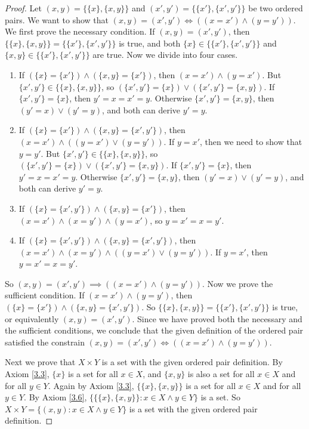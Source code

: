\begin{proof}
Let \((x, y) = \{\{x\}, \{x, y\}\}\) and \((x', y') = \{\{x'\}, \{x', y'\}\}\) be two ordered pairs.
We want to show that \((x, y) = (x', y') \iff ((x = x') \land (y = y'))\).
We first prove the necessary condition.
If \((x, y) = (x', y')\), then \(\{\{x\}, \{x, y\}\} = \{\{x'\}, \{x', y'\}\}\) is true, and both \(\{x\} \in \{\{x'\}, \{x', y'\}\}\) and \(\{x, y\} \in \{\{x'\}, \{x', y'\}\}\) are true.
Now we divide into four cases.
    \begin{enumerate}
        \item If \((\{x\} = \{x'\}) \land (\{x, y\} = \{x'\})\), then \((x = x') \land (y = x')\).
        But \(\{x', y'\} \in \{\{x\}, \{x, y\}\}\), so \((\{x', y'\} = \{x\}) \lor (\{x', y'\} = \{x, y\})\).
        If \(\{x', y'\} = \{x\}\), then \(y' = x = x' = y\).
        Otherwise \(\{x', y'\} = \{x, y\}\), then \((y' = x) \lor (y' = y)\), and both can derive \(y' = y\).
        \item If \((\{x\} = \{x'\}) \land (\{x, y\} = \{x', y'\})\), then \((x = x') \land ((y = x') \lor (y = y'))\).
        If \(y = x'\), then we need to show that \(y = y'\).
        But \(\{x', y'\} \in \{\{x\}, \{x, y\}\}\), so \((\{x', y'\} = \{x\}) \lor (\{x', y'\} = \{x, y\})\).
        If \(\{x', y'\} = \{x\}\), then \(y' = x = x' = y\).
        Otherwise \(\{x', y'\} = \{x, y\}\), then \((y' = x) \lor (y' = y)\), and both can derive \(y' = y\).
        \item If \((\{x\} = \{x', y'\}) \land (\{x, y\} = \{x'\})\), then \((x = x') \land (x = y') \land (y = x')\), so \(y = x' = x = y'\).
        \item If \((\{x\} = \{x', y'\}) \land (\{x, y\} = \{x', y'\})\), then \((x = x') \land (x = y') \land ((y = x') \lor (y = y'))\).
        If \(y = x'\), then \(y = x' = x = y'\).
    \end{enumerate}
So \((x, y) = (x', y') \implies ((x = x') \land (y = y'))\).
Now we prove the sufficient condition.
If \((x = x') \land (y = y')\), then \((\{x\} = \{x'\}) \land (\{x, y\} = \{x', y'\})\).
So \(\{\{x\}, \{x, y\}\} = \{\{x'\}, \{x', y'\}\}\) is true, or equivalently \((x, y) = (x', y')\).
Since we have proved both the necessary and the sufficient conditions, we conclude that the given definition of the ordered pair satisfied the constrain \((x, y) = (x', y') \iff ((x = x') \land (y = y'))\).

Next we prove that \(X \times Y\) is a set with the given ordered pair definition.
By Axiom \ref{3.3}, \(\{x\}\) is a set for all \(x \in X\), and \(\{x, y\}\) is also a set for all \(x \in X\) and for all \(y \in Y\).
Again by Axiom \ref{3.3}, \(\{\{x\}, \{x, y\}\}\) is a set for all \(x \in X\) and for all \(y \in Y\).
By Axiom \ref{3.6}, \(\{\{\{x\}, \{x, y\}\} : x \in X \land y \in Y\}\) is a set.
So \(X \times Y = \{(x, y) : x \in X \land y \in Y\}\) is a set with the given ordered pair definition.
\end{proof}

